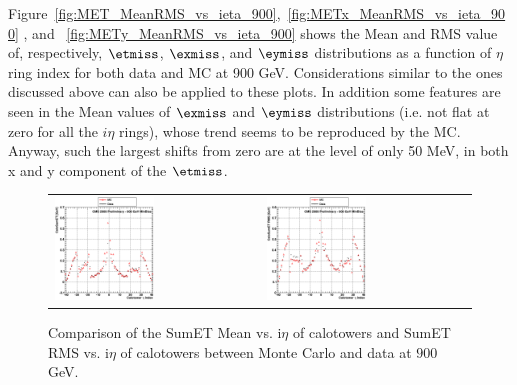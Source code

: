 Figure~\ref{fig:MET_MeanRMS_vs_ieta_900},~\ref{fig:METx_MeanRMS_vs_ieta_900}
, and ~\ref{fig:METy_MeanRMS_vs_ieta_900} shows the Mean and RMS value of, respectively,
$\etmiss$, $\exmiss$, and $\eymiss$ distributions as a function of $\eta$ ring 
index for both data and MC at 900 GeV.
Considerations similar to the ones discussed above can also be applied to these plots.
In addition some features are seen in the Mean values of $\exmiss$ and $\eymiss$ distributions
(i.e. not flat at zero for all the $i\eta$ rings), whose trend seems to be reproduced by the MC.
Anyway, such the largest shifts from zero are at the level of only 50 MeV, in both x and y component 
of the $\etmiss$.

\begin{figure}[h!]
 \centering
 \begin{tabular}{ll}
  \includegraphics[width=0.5\textwidth]{plots_DataVsMC_MB_900GeV/g_caloSumetMean_vs_ieta_900.eps} &
  \includegraphics[width=0.5\textwidth]{plots_DataVsMC_MB_900GeV/g_caloSumetRMS_vs_ieta_900.eps} \\
 \end{tabular}
 \caption{\small Comparison of the SumET Mean vs. i$\eta$ of calotowers and SumET RMS vs. i$\eta$ of calotowers between 
          Monte Carlo and data at $900$ GeV.\label{fig:SumET_MeanRMS_vs_ieta_900}}
\end{figure}

